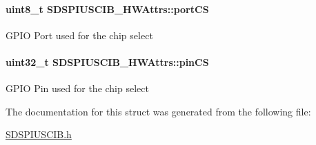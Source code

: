 \paragraph[{port\-C\-S}]{\setlength{\rightskip}{0pt plus 5cm}uint8\-\_\-t S\-D\-S\-P\-I\-U\-S\-C\-I\-B\-\_\-\-H\-W\-Attrs\-::port\-C\-S}\label{struct_s_d_s_p_i_u_s_c_i_b___h_w_attrs_a0129b7fe4659c981ba8f10972587f845}
G\-P\-I\-O Port used for the chip select 
\paragraph[{pin\-C\-S}]{\setlength{\rightskip}{0pt plus 5cm}uint32\-\_\-t S\-D\-S\-P\-I\-U\-S\-C\-I\-B\-\_\-\-H\-W\-Attrs\-::pin\-C\-S}\label{struct_s_d_s_p_i_u_s_c_i_b___h_w_attrs_a3afe9dbe3f17c8dbb9994eb936e57db1}
G\-P\-I\-O Pin used for the chip select 

The documentation for this struct was generated from the following file\-:\begin{DoxyCompactItemize}
\item 
\hyperlink{_s_d_s_p_i_u_s_c_i_b_8h}{S\-D\-S\-P\-I\-U\-S\-C\-I\-B.\-h}\end{DoxyCompactItemize}
